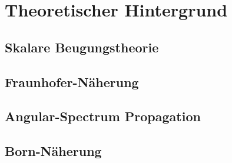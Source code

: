 \chapter{Theoretischer Hintergrund}
\label{c_theorie}
 
\section{Skalare Beugungstheorie}
\section{Fraunhofer-Näherung}
\section{Angular-Spectrum Propagation}
\section{Born-Näherung}


